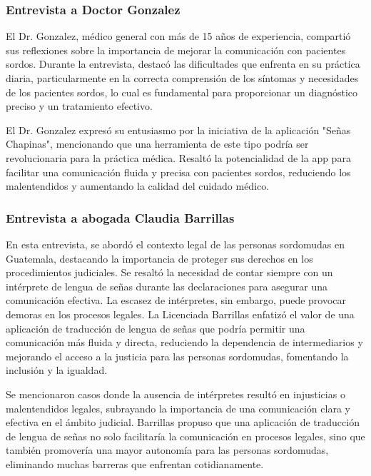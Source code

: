 \subsubsection{Entrevista a Doctor Gonzalez}

El Dr. Gonzalez, médico general con más de 15 años de experiencia, compartió sus reflexiones sobre la importancia de mejorar la comunicación con pacientes sordos. Durante la entrevista, destacó las dificultades que enfrenta en su práctica diaria, particularmente en la correcta comprensión de los síntomas y necesidades de los pacientes sordos, lo cual es fundamental para proporcionar un diagnóstico preciso y un tratamiento efectivo.

El Dr. Gonzalez expresó su entusiasmo por la iniciativa de la aplicación "Señas Chapinas", mencionando que una herramienta de este tipo podría ser revolucionaria para la práctica médica. Resaltó la potencialidad de la app para facilitar una comunicación fluida y precisa con pacientes sordos, reduciendo los malentendidos y aumentando la calidad del cuidado médico. 

\subsubsection{Entrevista a abogada Claudia Barrillas}

En esta entrevista, se abordó el contexto legal de las personas sordomudas en Guatemala, destacando la importancia de proteger sus derechos en los procedimientos judiciales. Se resaltó la necesidad de contar siempre con un intérprete de lengua de señas durante las declaraciones para asegurar una comunicación efectiva. La escasez de intérpretes, sin embargo, puede provocar demoras en los procesos legales. La Licenciada Barrillas enfatizó el valor de una aplicación de traducción de lengua de señas que podría permitir una comunicación más fluida y directa, reduciendo la dependencia de intermediarios y mejorando el acceso a la justicia para las personas sordomudas, fomentando la inclusión y la igualdad.

Se mencionaron casos donde la ausencia de intérpretes resultó en injusticias o malentendidos legales, subrayando la importancia de una comunicación clara y efectiva en el ámbito judicial. Barrillas propuso que una aplicación de traducción de lengua de señas no solo facilitaría la comunicación en procesos legales, sino que también promovería una mayor autonomía para las personas sordomudas, eliminando muchas barreras que enfrentan cotidianamente.

